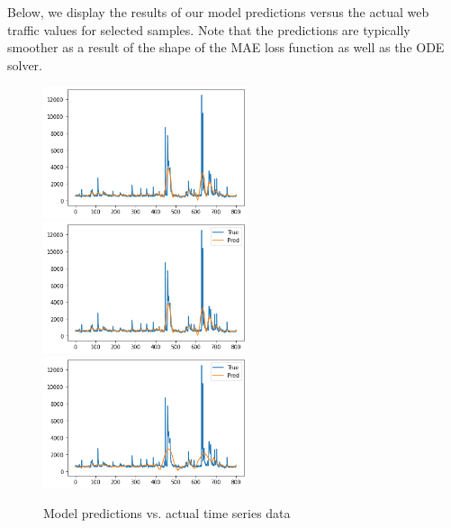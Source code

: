 \documentclass{article} %
\begin{document}
\newpage
Below, we display the results of our model predictions versus the actual web traffic values for selected samples. Note that the predictions are typically smoother as a result of the shape of the MAE loss function as well as the ODE solver.
\begin{figure}[h]
  \centering
  \includegraphics[width=6cm]{predict1.png}
  \includegraphics[width=6cm]{predict2.png}
  \includegraphics[width=6cm]{predict3.png}
  \caption{Model predictions vs. actual time series data}
\end{figure}
\end{document}
